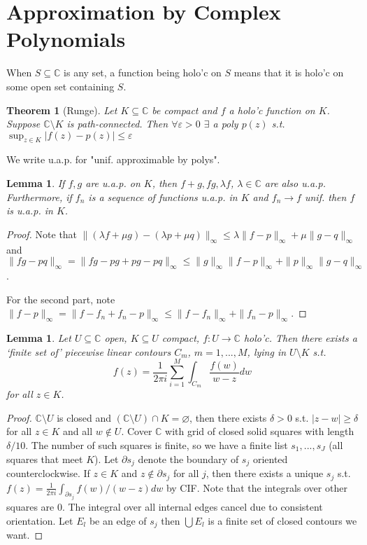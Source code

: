 \documentclass{article}
\newcommand{\e}{\varepsilon}
\theoremstyle{definition}
\theoremstyle{remark}
\theoremstyle{plain}
\newtheorem{lem}[defn]{Lemma}
\newtheorem{thm}[defn]{Theorem}
\newcommand{\CC}{\mathbb{C}}
\begin{document}
\section{Approximation by Complex Polynomials}
When $S\subseteq\CC$ is any set, a function being holo'c on $S$ means that it is holo'c on some open set containing $S$.
\begin{thm}[Runge]
    Let $K\subseteq\CC$ be compact and $f$ a holo'c function on $K$. Suppose $\CC\setminus K$ is path-connected. Then $\forall\e>0$ $\exists$ a poly $p(z)$ s.t. $\sup_{z\in K}|f(z)-p(z)|\le\e$
\end{thm}
We write u.a.p. for "unif. approximable by polys".
\begin{lem}
    If $f,g$ are u.a.p. on $K$, then $f+g,fg,\lambda f$, $\lambda\in\CC$ are also u.a.p. Furthermore, if $f_n$ is a sequence of functions u.a.p. in $K$ and $f_n\to f$ unif. then $f$ is u.a.p. in $K$.
\end{lem}
\begin{proof}
    Note that $\|(\lambda f+\mu g)-(\lambda p+\mu q)\|_\infty\le \lambda\|f-p\|_\infty+\mu\|g-q\|_\infty$ and $\|fg-pq\|_\infty=\|fg-pg+pg-pq\|_\infty\le\|g\|_\infty\|f-p\|_\infty+\|p\|_\infty\|g-q\|_\infty$.

    For the second part, note
    $\|f-p\|_\infty=\|f-f_n+f_n-p\|_\infty\le\|f-f_n\|_\infty+\|f_n-p\|_\infty$.
\end{proof}
\begin{lem}
    Let $U\subseteq\CC$ open, $K\subseteq U$ compact, $f:U\to \CC$ holo'c. Then there exists a `finite set of' piecewise linear contours $C_m$, $m=1,...,M$, lying in $U\setminus K$ s.t. \[f(z)=\frac{1}{2\pi i}\sum_{i=1}^M\int_{C_m}\frac{f(w)}{w-z}dw\]
    for all $z\in K$.
\end{lem}
\begin{proof}
    $\CC\setminus U$ is closed and $(\CC\setminus U)\cap K=\varnothing$, then there exists $\delta>0$ s.t. $|z-w|\ge \delta$ for all $z\in K$ and all $w\not\in U$. Cover $\CC$ with grid of closed solid squares with length $\delta/10$. The number of such squares is finite, so we have a finite list $s_1,...,s_J$ (all squares that meet $K$). Let $\partial s_j$ denote the boundary of $s_j$ oriented counterclockwise. If $z\in K$ and $z\not\in \partial s_j$ for all $j$, then there exists a unique $s_j$ s.t. $f(z)=\frac{1}{2\pi i}\int_{\partial s_j}f(w)/(w-z)dw$ by CIF. Note that the integrals over other squares are $0$. The integral over all internal edges cancel due to consistent orientation. Let $E_l$ be an edge of $s_j$ then $\bigcup E_l$ is a finite set of closed contours we want.
\end{proof}
\end{document}
